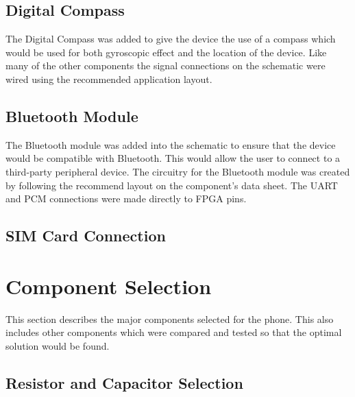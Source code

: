 \subsection{Digital Compass}

	The Digital Compass was added to give the device the use of a compass which would be used for both gyroscopic effect and the location of the device.
Like many of the other components the signal connections on the schematic were wired using the recommended application layout. 

\subsection{Bluetooth Module}

	The Bluetooth module was added into the schematic to ensure that the device would be compatible with Bluetooth. This would allow the user to connect to a third-party peripheral device.
The circuitry for the Bluetooth module was created by following the recommend layout on the component's data sheet. The UART and PCM connections were made directly to FPGA pins. 

\subsection{SIM Card Connection}
\label{chap:SIM}
	

\section{Component Selection} 
	
	This section describes the major components selected for the phone. This also includes other components which were compared and tested so that the optimal solution would be found. 


\subsection{Resistor and Capacitor Selection}

